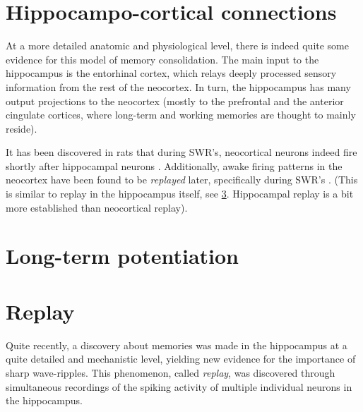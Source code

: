 \section{Hippocampo-cortical connections}

At a more detailed anatomic and physiological level, there is indeed quite some evidence for this model of memory consolidation. The main input to the hippocampus is the entorhinal cortex, which relays deeply processed sensory information from the rest of the neocortex. In turn, the hippocampus has many output projections to the neocortex (mostly to the prefrontal and the anterior cingulate cortices, where long-term and working memories are thought to mainly reside).

It has been discovered in rats that during SWR's, neocortical neurons indeed fire shortly after hippocampal neurons \cite{Wierzynski2009}. Additionally, awake firing patterns in the neocortex have been found to be \emph{replayed} later, specifically during SWR's \cite{Peyrache2009}. (This is similar to replay in the hippocampus itself, see \cref{sec:replay}. Hippocampal replay is a bit more established than neocortical replay).




\section{Long-term potentiation}






\section{Replay}
\label{sec:replay}


Quite recently, a discovery about memories was made in the hippocampus at a quite detailed and mechanistic level, yielding new evidence for the importance of sharp wave-ripples. This phenomenon, called \emph{replay}, was discovered through simultaneous recordings of the spiking activity of multiple individual neurons in the hippocampus.\footnotemark{}


